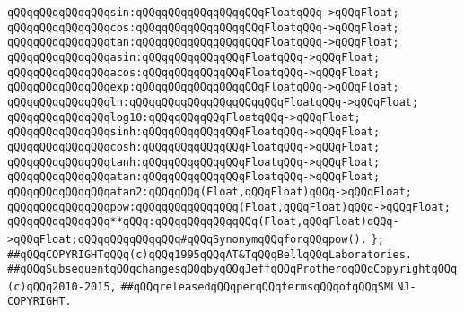 \verb|qQQqqQQqqQQqqQQqsin:qQQqqQQqqQQqqQQqqQQqFloatqQQq->qQQqFloat;|\newline
\verb|qQQqqQQqqQQqqQQqcos:qQQqqQQqqQQqqQQqqQQqFloatqQQq->qQQqFloat;|\newline
\verb|qQQqqQQqqQQqqQQqtan:qQQqqQQqqQQqqQQqqQQqFloatqQQq->qQQqFloat;|\newline
\verb|qQQqqQQqqQQqqQQqasin:qQQqqQQqqQQqqQQqFloatqQQq->qQQqFloat;|\newline
\verb|qQQqqQQqqQQqqQQqacos:qQQqqQQqqQQqqQQqFloatqQQq->qQQqFloat;|\newline
\verb|qQQqqQQqqQQqqQQqexp:qQQqqQQqqQQqqQQqqQQqFloatqQQq->qQQqFloat;|\newline
\verb|qQQqqQQqqQQqqQQqln:qQQqqQQqqQQqqQQqqQQqqQQqFloatqQQq->qQQqFloat;|\newline
\verb|qQQqqQQqqQQqqQQqlog10:qQQqqQQqqQQqFloatqQQq->qQQqFloat;|\newline
\verb|qQQqqQQqqQQqqQQqsinh:qQQqqQQqqQQqqQQqFloatqQQq->qQQqFloat;|\newline
\verb|qQQqqQQqqQQqqQQqcosh:qQQqqQQqqQQqqQQqFloatqQQq->qQQqFloat;|\newline
\verb|qQQqqQQqqQQqqQQqtanh:qQQqqQQqqQQqqQQqFloatqQQq->qQQqFloat;|\newline
\verb|qQQqqQQqqQQqqQQqatan:qQQqqQQqqQQqqQQqFloatqQQq->qQQqFloat;|\newline
\verb|qQQqqQQqqQQqqQQqatan2:qQQqqQQq(Float,qQQqFloat)qQQq->qQQqFloat;|\newline
\verb|qQQqqQQqqQQqqQQqpow:qQQqqQQqqQQqqQQq(Float,qQQqFloat)qQQq->qQQqFloat;|\newline
\verb|qQQqqQQqqQQqqQQq**qQQq:qQQqqQQqqQQqqQQq(Float,qQQqFloat)qQQq->qQQqFloat;qQQqqQQqqQQqqQQq#qQQqSynonymqQQqforqQQqpow().|\newline
\verb|};|\newline
\newline
\newline
\newline
\newline
\verb|##qQQqCOPYRIGHTqQQq(c)qQQq1995qQQqAT&TqQQqBellqQQqLaboratories.|\newline
\verb|##qQQqSubsequentqQQqchangesqQQqbyqQQqJeffqQQqProtheroqQQqCopyrightqQQq(c)qQQq2010-2015,|\newline
\verb|##qQQqreleasedqQQqperqQQqtermsqQQqofqQQqSMLNJ-COPYRIGHT.|\newline

